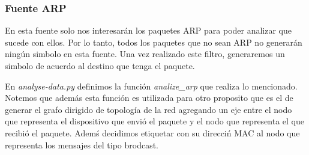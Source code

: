\subsubsection{Fuente ARP}

En esta fuente solo nos interesar\'an los paquetes ARP para poder analizar que sucede con ellos. Por lo tanto, todos los paquetes que no sean ARP no generar\'an ning\'un simbolo en esta fuente. Una vez realizado este filtro, generaremos un simbolo de acuerdo al destino que tenga el paquete.

En \textit{analyse-data.py} definimos la funci\'on \textit{analize\_arp} que realiza lo mencionado. Notemos que adem\'as esta funci\'on es utilizada para otro proposito que es el de generar el grafo dirigido de topolog\'ia de la red agregando un eje entre el nodo que representa el dispositivo que envi\'o el paquete y el nodo que representa el que recibi\'o el paquete. Adem\'s decidimos etiquetar con su direcci\'n MAC al nodo que representa los mensajes del tipo brodcast.
